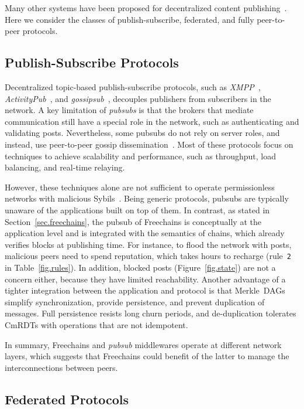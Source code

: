 \documentclass[10pt,journal,compsoc]{IEEEtran}
\newcommand{\FC}       {Freechains\xspace}
\newcommand{\code}[1]  {\texttt{\footnotesize{#1}}}
\begin{document}
Many other systems have been proposed for decentralized content
publishing~\cite{p2p.survey,p2p.ecosystem}.
Here we consider the classes of publish-subscribe, federated, and fully
peer-to-peer protocols.

\subsection{Publish-Subscribe Protocols}

Decentralized topic-based publish-subscribe protocols, such as
    \emph{XMPP}~\cite{pubsub.xmpp},
    \emph{ActivityPub}~\cite{pubsub.activitypub}, and
    \emph{gossipsub}~\cite{pubsub.gossipsub},
decouples publishers from subscribers in the network.
%
A key limitation of \emph{pubsubs} is that the brokers that mediate
communication still have a special role in the network, such as authenticating
and validating posts.
%
Nevertheless, some pubsubs do not rely on server roles, and instead, use
peer-to-peer gossip dissemination~\cite{pubsub.tera,pubsub.rappel,pubsub.stan,pubsub.vitis,pubsub.gossipsub,pubsub.rappel}.
Most of these protocols focus on techniques to achieve scalability and
performance, such as throughput, load balancing, and real-time relaying.

However, these techniques alone are not sufficient to operate permissionless
networks with malicious Sybils~\cite{pubsub.gossipsub2}.
Being generic protocols, pubsubs are typically unaware of the applications
built on top of them.
%
In contrast, as stated in Section~\ref{sec.freechains}, the pubsub of \FC is
conceptually at the application level and is integrated with the semantics of
chains, which already verifies blocks at publishing time.
For instance, to flood the network with posts, malicious peers need to spend
reputation, which takes hours to recharge (rule~\code{2} in
Table~\ref{fig.rules}).
In addition, blocked posts (Figure~\ref{fig.state}) are not a concern either,
because they have limited reachability.
Another advantage of a tighter integration between the application and protocol
is that Merkle~DAGs simplify synchronization, provide persistence, and prevent
duplication of messages.
Full persistence resists long churn periods, and de-duplication tolerates
CmRDTs with operations that are not idempotent.

In summary, \FC and \emph{pubsub} middlewares operate at different network
layers, which suggests that \FC could benefit of the latter to manage the
interconnections between peers.

\subsection{Federated Protocols}
\end{document}
